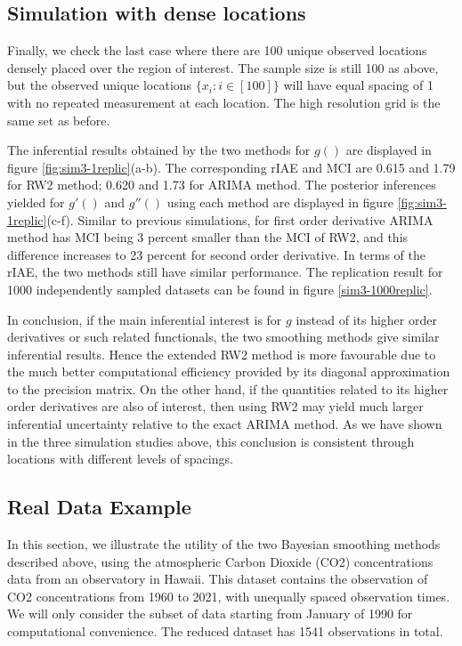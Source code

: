 \documentclass{article}
\begin{document}
\subsection{Simulation with dense locations}

Finally, we check the last case where there are 100 unique observed locations densely placed over the region of interest. The sample size is still 100 as above, but the observed unique locations $\{x_i: i\in [100]\}$ will have equal spacing of 1 with no repeated measurement at each location. The high resolution grid is the same set as before.

The inferential results obtained by the two methods for $g()$ are displayed in figure \ref{fig:sim3-1replic}(a-b). The corresponding rIAE and MCI are 0.615 and 1.79 for RW2 method; 0.620 and 1.73 for ARIMA method. The posterior inferences yielded for $g'()$ and $g''()$ using each method are displayed in figure \ref{fig:sim3-1replic}(c-f). Similar to previous simulations, for first order derivative ARIMA method has MCI being 3 percent smaller than the MCI of RW2, and this difference increases to 23 percent for second order derivative. In terms of the rIAE, the two methods still have similar performance. The replication result for 1000 independently sampled datasets can be found in figure \ref{sim3-1000replic}.

In conclusion, if the main inferential interest is for $g$ instead of its higher order derivatives or such related functionals, the two smoothing methods give similar inferential results. Hence the extended RW2 method is more favourable due to the much better computational efficiency provided by its diagonal approximation to the precision matrix. On the other hand, if the quantities related to its higher order derivatives are also of interest, then using RW2 may yield much larger inferential uncertainty relative to the exact ARIMA method. As we have shown in the three simulation studies above, this conclusion is consistent through locations with different levels of spacings. 







\subsection{Real Data Example}\label{co2}

In this section, we illustrate the utility of the two Bayesian smoothing methods described above, using the atmospheric Carbon Dioxide (CO2) concentrations data from an observatory in Hawaii. This dataset contains the observation of CO2 concentrations from 1960 to 2021, with unequally spaced observation times. We will only consider the subset of data starting from January of 1990 for computational convenience. The reduced dataset has 1541 observations in total.
\end{document}
